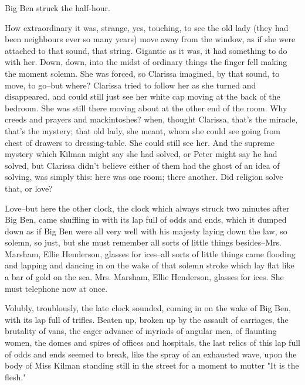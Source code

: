 \documentclass[lang=cn,10pt]{elegantbook}
\begin{document}
Big Ben struck the half-hour.

How extraordinary it was, strange, yes, touching, to see the old
lady (they had been neighbours ever so many years) move away from
the window, as if she were attached to that sound, that string.
Gigantic as it was, it had something to do with her.  Down, down,
into the midst of ordinary things the finger fell making the moment
solemn.  She was forced, so Clarissa imagined, by that sound, to
move, to go--but where?  Clarissa tried to follow her as she turned
and disappeared, and could still just see her white cap moving at
the back of the bedroom.  She was still there moving about at the
other end of the room.  Why creeds and prayers and mackintoshes?
when, thought Clarissa, that's the miracle, that's the mystery;
that old lady, she meant, whom she could see going from chest of
drawers to dressing-table.  She could still see her.  And the
supreme mystery which Kilman might say she had solved, or Peter
might say he had solved, but Clarissa didn't believe either of them
had the ghost of an idea of solving, was simply this: here was one
room; there another.  Did religion solve that, or love?

Love--but here the other clock, the clock which always struck two
minutes after Big Ben, came shuffling in with its lap full of odds
and ends, which it dumped down as if Big Ben were all very well
with his majesty laying down the law, so solemn, so just, but she
must remember all sorts of little things besides--Mrs. Marsham,
Ellie Henderson, glasses for ices--all sorts of little things came
flooding and lapping and dancing in on the wake of that solemn
stroke which lay flat like a bar of gold on the sea.  Mrs. Marsham,
Ellie Henderson, glasses for ices.  She must telephone now at once.

Volubly, troublously, the late clock sounded, coming in on the wake
of Big Ben, with its lap full of trifles.  Beaten up, broken up by
the assault of carriages, the brutality of vans, the eager advance
of myriads of angular men, of flaunting women, the domes and spires
of offices and hospitals, the last relics of this lap full of odds
and ends seemed to break, like the spray of an exhausted wave, upon
the body of Miss Kilman standing still in the street for a moment
to mutter "It is the flesh."
\end{document}
